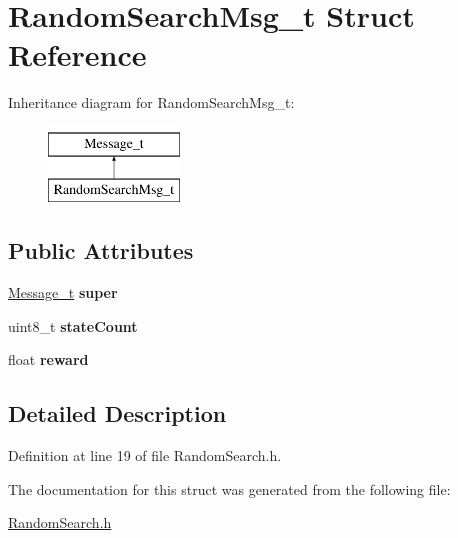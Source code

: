 \hypertarget{structRandomSearchMsg__t}{
\section{RandomSearchMsg\_\-t Struct Reference}
\label{structRandomSearchMsg__t}
}
Inheritance diagram for RandomSearchMsg\_\-t:\begin{figure}[H]
\begin{center}
\leavevmode
\includegraphics[height=2.000000cm]{structRandomSearchMsg__t}
\end{center}
\end{figure}
\subsection*{Public Attributes}
\begin{DoxyCompactItemize}
\item 
\hypertarget{structRandomSearchMsg__t_af8bfd8028f8d4f4cd7761030f9ebd0a1}{
\hyperlink{structMessage__t}{Message\_\-t} {\bfseries super}}
\label{structRandomSearchMsg__t_af8bfd8028f8d4f4cd7761030f9ebd0a1}

\item 
\hypertarget{structRandomSearchMsg__t_affbedc14e8f408e9824159bbbb8e3170}{
uint8\_\-t {\bfseries stateCount}}
\label{structRandomSearchMsg__t_affbedc14e8f408e9824159bbbb8e3170}

\item 
\hypertarget{structRandomSearchMsg__t_a011917a8cdc8c0c068e5dbdcff644130}{
float {\bfseries reward}}
\label{structRandomSearchMsg__t_a011917a8cdc8c0c068e5dbdcff644130}

\end{DoxyCompactItemize}


\subsection{Detailed Description}


Definition at line 19 of file RandomSearch.h.



The documentation for this struct was generated from the following file:\begin{DoxyCompactItemize}
\item 
\hyperlink{RandomSearch_8h}{RandomSearch.h}\end{DoxyCompactItemize}
